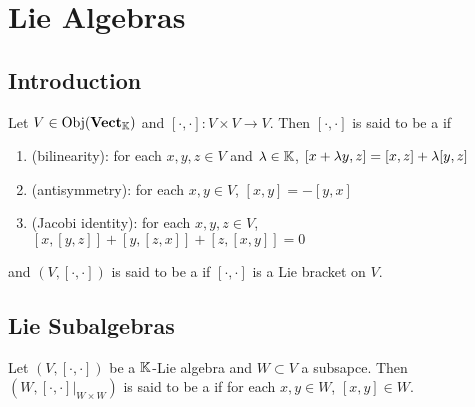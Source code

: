 \documentclass{book}
\begin{document}
\section{Lie Algebras}

\subsection{Introduction}

\begin{defn}
	Let $V \in \operatorname{Obj}(\operatorname*{\text{\textbf{Vect}}_{\mathbb{K}}})$ and $[\cdot, \cdot]: V \times V \rightarrow V$. Then $[\cdot, \cdot]$ is said to be a  if 
	\begin{enumerate}
		\item (bilinearity): for each $x, y, z \in V$ and $\lambda \in \mathbb{K}$, $[x + \lambda y, z] = [x, z] + \lambda [y, z]$ 
		\item (antisymmetry): for each $x, y \in V$, $[x, y] = -[y,x]$
		\item (Jacobi identity): for each $x,y, z \in V$, $[x, [y,z]] + [y, [z,x]] + [z, [x,y]] = 0$
	\end{enumerate}
	and $(V, [\cdot, \cdot])$ is said to be a  if $[\cdot, \cdot]$ is a Lie bracket on $V$.
\end{defn}











































\subsection{Lie Subalgebras}

\begin{defn}
	Let $(V, [\cdot, \cdot])$ be a $\mathbb{K}$-Lie algebra and $W \subset V$ a subsapce. Then $(W, [\cdot, \cdot]|_{W \times W})$ is said to be a  if for each $x, y \in W$, $[x, y] \in W$.
\end{defn}
\end{document}
